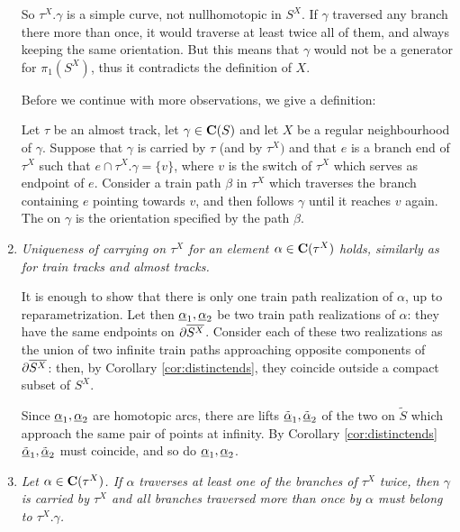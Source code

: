 \begin{rmk}
\begin{enumerate}
So $\tau^X.\gamma$ is a simple curve, not nullhomotopic in $S^X$. If $\gamma$ traversed any branch there more than once, it would traverse at least twice all of them, and always keeping the same orientation. But this means that $\gamma$ would not be a generator for $\pi_1(S^X)$, thus it contradicts the definition of $X$.

Before we continue with more observations, we give a definition:
\begin{defin}\label{def:eorientation}
Let $\tau$ be an almost track, let $\gamma\in \mathbf C(S)$ and let $X$ be a regular neighbourhood of $\gamma$. Suppose that $\gamma$ is carried by $\tau$ (and by $\tau^X)$ and that $e$ is a branch end of $\tau^X$ such that $e\cap \tau^X.\gamma=\{v\}$, where $v$ is the switch of $\tau^X$ which serves as endpoint of $e$. Consider a train path $\beta$ in $\tau^X$ which traverses the branch containing $e$ pointing towards $v$, and then follows $\gamma$ until it reaches $v$ again. The  on $\gamma$ is the orientation specified by the path $\beta$.
\end{defin}

\item\label{itm:uniquecarrying} \textit{Uniqueness of carrying on $\tau^X$ for an element $\alpha\in \mathbf C(\tau^X)$ holds, similarly as for train tracks and almost tracks.}

It is enough to show that there is only one train path realization of $\alpha$, up to reparametrization. Let then $\underline{\alpha}_1,\underline{\alpha}_2$ be two train path realizations of $\alpha$: they have the same endpoints on $\partial\overline{S^X}$. Consider each of these two realizations as the union of two infinite train paths approaching opposite components of $\partial\overline{S^X}$: then, by Corollary \ref{cor:distinctends}, they coincide outside a compact subset of $S^X$.

Since $\underline{\alpha}_1,\underline{\alpha}_2$ are homotopic arcs, there are lifts $\tilde{\underline{\alpha}}_1,\tilde{\underline{\alpha}}_2$ of the two on $\tilde S$ which approach the same pair of points at infinity. By Corollary \ref{cor:distinctends} $\tilde{\underline{\alpha}}_1,\tilde{\underline{\alpha}}_2$ must coincide, and so do $\underline{\alpha}_1,\underline{\alpha}_2$.

\item\label{itm:windaboutgamma} \textit{Let $\alpha\in\mathbf C(\tau^X)$. If $\alpha$ traverses at least one of the branches of $\tau^X$ twice, then $\gamma$ is carried by $\tau^X$ and all branches traversed more than once by $\alpha$ must belong to $\tau^X.\gamma$.}


\end{enumerate}
\end{rmk}
